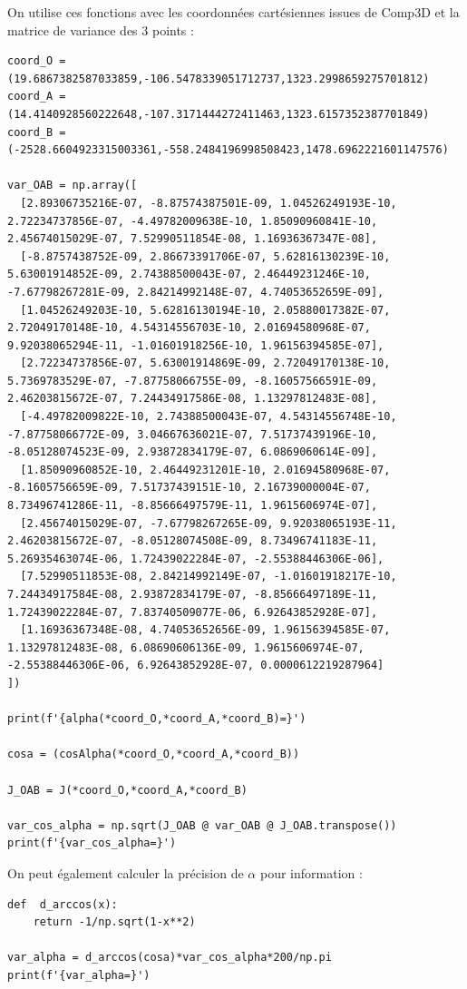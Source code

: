 \documentclass[french]{report}
\begin{document}
On utilise ces fonctions avec les coordonnées cartésiennes issues de Comp3D et la matrice de variance des 3 points :

\begin{lstlisting}
coord_O = (19.6867382587033859,-106.5478339051712737,1323.2998659275701812) 
coord_A = (14.4140928560222648,-107.3171444272411463,1323.6157352387701849)
coord_B = (-2528.6604923315003361,-558.2484196998508423,1478.6962221601147576)

var_OAB = np.array([
  [2.89306735216E-07, -8.87574387501E-09, 1.04526249193E-10, 2.72234737856E-07, -4.49782009638E-10, 1.85090960841E-10, 2.45674015029E-07, 7.52990511854E-08, 1.16936367347E-08],
  [-8.8757438752E-09, 2.86673391706E-07, 5.62816130239E-10, 5.63001914852E-09, 2.74388500043E-07, 2.46449231246E-10, -7.67798267281E-09, 2.84214992148E-07, 4.74053652659E-09],
  [1.04526249203E-10, 5.62816130194E-10, 2.05880017382E-07, 2.72049170148E-10, 4.54314556703E-10, 2.01694580968E-07, 9.92038065294E-11, -1.01601918256E-10, 1.96156394585E-07],
  [2.72234737856E-07, 5.63001914869E-09, 2.72049170138E-10, 5.7369783529E-07, -7.87758066755E-09, -8.16057566591E-09, 2.46203815672E-07, 7.24434917586E-08, 1.13297812483E-08],
  [-4.49782009822E-10, 2.74388500043E-07, 4.54314556748E-10, -7.87758066772E-09, 3.04667636021E-07, 7.51737439196E-10, -8.05128074523E-09, 2.93872834179E-07, 6.0869060614E-09],
  [1.85090960852E-10, 2.46449231201E-10, 2.01694580968E-07, -8.1605756659E-09, 7.51737439151E-10, 2.16739000004E-07, 8.73496741286E-11, -8.85666497579E-11, 1.9615606974E-07],
  [2.45674015029E-07, -7.67798267265E-09, 9.92038065193E-11, 2.46203815672E-07, -8.05128074508E-09, 8.73496741183E-11, 5.26935463074E-06, 1.72439022284E-07, -2.55388446306E-06],
  [7.52990511853E-08, 2.84214992149E-07, -1.01601918217E-10, 7.24434917584E-08, 2.93872834179E-07, -8.85666497189E-11, 1.72439022284E-07, 7.83740509077E-06, 6.92643852928E-07],
  [1.16936367348E-08, 4.74053652656E-09, 1.96156394585E-07, 1.13297812483E-08, 6.08690606136E-09, 1.9615606974E-07, -2.55388446306E-06, 6.92643852928E-07, 0.0000612219287964]
])

print(f'{alpha(*coord_O,*coord_A,*coord_B)=}')

cosa = (cosAlpha(*coord_O,*coord_A,*coord_B))

J_OAB = J(*coord_O,*coord_A,*coord_B)

var_cos_alpha = np.sqrt(J_OAB @ var_OAB @ J_OAB.transpose())
print(f'{var_cos_alpha=}')
\end{lstlisting}

On peut également calculer la précision de $\alpha$ pour information :
\begin{lstlisting}
def  d_arccos(x):
    return -1/np.sqrt(1-x**2)

var_alpha = d_arccos(cosa)*var_cos_alpha*200/np.pi
print(f'{var_alpha=}')
\end{lstlisting}
\end{document}
